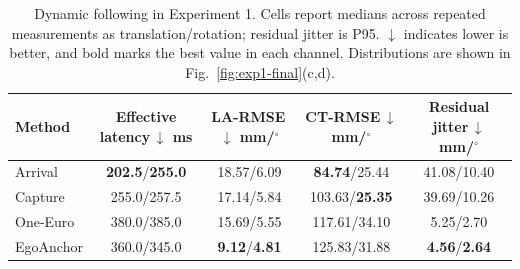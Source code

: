 \begin{table}[t]
\centering
\caption{Dynamic following in Experiment 1. Cells report medians across repeated measurements as translation/rotation; residual jitter is P95. $\downarrow$ indicates lower is better, and bold marks the best value in each channel. Distributions are shown in Fig.~\ref{fig:exp1-final}(c,d).}
\label{tab:exp1-dynamic}
\setlength{\tabcolsep}{2pt}
\begin{tabular}{@{}lcccc@{}}
\toprule
Method & \shortstack{Effective\\latency\,$\downarrow$\\ms} & \shortstack{LA-RMSE\,$\downarrow$\\mm/$^\circ$} & \shortstack{CT-RMSE\,$\downarrow$\\mm/$^\circ$} & \shortstack{Residual\\jitter\,$\downarrow$\\mm/$^\circ$} \\
\midrule
Arrival & \textbf{202.5}/\textbf{255.0} & 18.57/6.09 & \textbf{84.74}/25.44 & 41.08/10.40 \\
Capture & 255.0/257.5 & 17.14/5.84 & 103.63/\textbf{25.35} & 39.69/10.26 \\
One-Euro & 380.0/385.0 & 15.69/5.55 & 117.61/34.10 & 5.25/2.70 \\
EgoAnchor & 360.0/345.0 & \textbf{9.12}/\textbf{4.81} & 125.83/31.88 & \textbf{4.56}/\textbf{2.64} \\
\bottomrule
\end{tabular}
\end{table}
